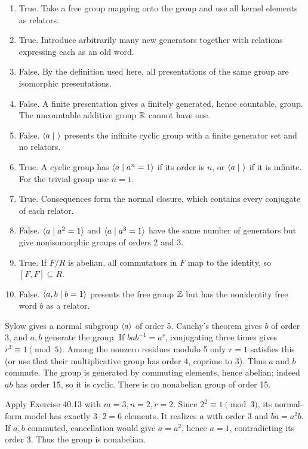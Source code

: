 \begin{enumerate}[label=\textbf{(\alph*)}]
\item True. Take a free group mapping onto the group and use all kernel elements as relators.
\item True. Introduce arbitrarily many new generators together with relations expressing each as an old word.
\item False. By the definition used here, all presentations of the same group are isomorphic presentations.
\item False. A finite presentation gives a finitely generated, hence countable, group. The uncountable additive group $\mathbb{R}$ cannot have one.
\item False. $\langle a\mid\ \rangle$ presents the infinite cyclic group with a finite generator set and no relators.
\item True. A cyclic group has $\langle a\mid a^n=1\rangle$ if its order is $n$, or $\langle a\mid\ \rangle$ if it is infinite. For the trivial group use $n=1$.
\item True. Consequences form the normal closure, which contains every conjugate of each relator.
\item False. $\langle a\mid a^2=1\rangle$ and $\langle a\mid a^3=1\rangle$ have the same number of generators but give nonisomorphic groups of orders 2 and 3.
\item True. If $F/R$ is abelian, all commutators in $F$ map to the identity, so $[F,F]\subseteq R$.
\item False. $\langle a,b\mid b=1\rangle$ presents the free group $\mathbb{Z}$ but has the nonidentity free word $b$ as a relator.
\end{enumerate}

Sylow gives a normal subgroup $\langle a\rangle$ of order 5. Cauchy's theorem gives $b$ of order 3, and $a,b$ generate the group. If $bab^{-1}=a^r$, conjugating three times gives $r^3\equiv1\pmod5$.
Among the nonzero residues modulo 5 only $r=1$ satisfies this (or use that their multiplicative group has order 4, coprime to 3). Thus $a$ and $b$ commute.
The group is generated by commuting elements, hence abelian; indeed $ab$ has order 15, so it is cyclic. There is no nonabelian group of order 15.

Apply Exercise 40.13 with $m=3,n=2,r=2$. Since $2^2\equiv1\pmod3$, its normal-form model has exactly $3\cdot2=6$ elements.
It realizes $a$ with order 3 and $ba=a^2b$. If $a,b$ commuted, cancellation would give $a=a^2$, hence $a=1$, contradicting its order 3. Thus the group is nonabelian.

